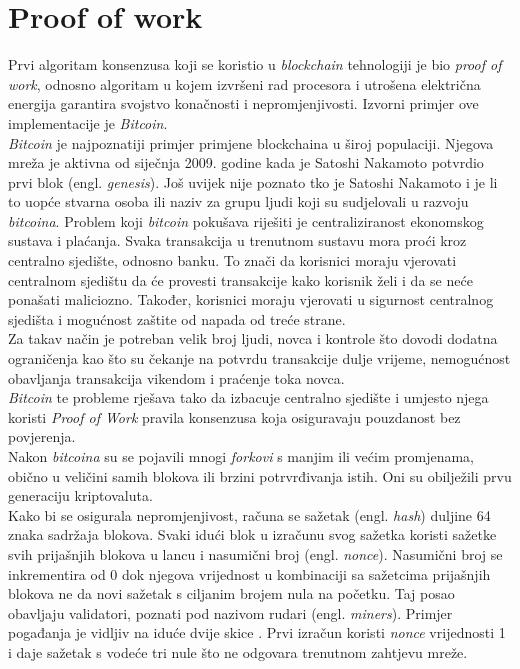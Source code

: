 \documentclass[times, utf8, zavrsni, numeric]{fer}
\begin{document}
\section{Proof of work}
Prvi algoritam konsenzusa koji se koristio u \emph{blockchain} tehnologiji je bio \emph{proof of work},
 odnosno algoritam u kojem izvršeni rad procesora i utrošena električna energija
garantira svojstvo konačnosti i nepromjenjivosti. Izvorni primjer ove implementacije je \emph{Bitcoin}. \\
\emph{Bitcoin} je najpoznatiji primjer primjene blockchaina u široj populaciji. Njegova mreža je aktivna 
od siječnja 2009. godine kada je Satoshi Nakamoto potvrdio prvi blok (engl. \emph{genesis}).
Još uvijek nije poznato tko je Satoshi Nakamoto i je li to uopće stvarna osoba ili naziv za grupu
ljudi koji su sudjelovali u razvoju \emph{bitcoina}. Problem koji \emph{bitcoin} pokušava riješiti je centraliziranost
ekonomskog sustava i plaćanja. Svaka transakcija u trenutnom sustavu mora proći kroz centralno sjedište,
odnosno banku. To znači da korisnici moraju vjerovati centralnom sjedištu da će provesti transakcije
kako korisnik želi i da se neće ponašati maliciozno. Također, korisnici moraju vjerovati u sigurnost
centralnog sjedišta i mogućnost zaštite od napada od treće strane. \\
Za takav način je potreban velik broj ljudi, novca i kontrole što dovodi dodatna ograničenja kao što 
su čekanje na potvrdu transakcije dulje vrijeme, nemogućnost obavljanja transakcija vikendom i praćenje
toka novca. \\
\emph{Bitcoin} te probleme rješava tako da izbacuje centralno sjedište i umjesto njega koristi \emph{Proof of Work}
pravila konsenzusa koja osiguravaju pouzdanost bez povjerenja. \\
Nakon \emph{bitcoina} su se pojavili mnogi \emph{forkovi} s manjim ili većim promjenama, obično u veličini
samih blokova ili brzini potrvrđivanja istih. Oni su obilježili prvu generaciju kriptovaluta. \\
Kako bi se osigurala nepromjenjivost, računa se sažetak (engl. \emph{hash}) duljine 64 znaka sadržaja blokova. 
Svaki idući blok u izračunu svog sažetka koristi sažetke svih prijašnjih blokova u lancu i nasumični broj (engl. \emph{nonce}). Nasumični broj se inkrementira od 0
dok njegova vrijednost u kombinaciji sa sažetcima prijašnjih blokova ne da novi sažetak s ciljanim brojem nula na početku. Taj posao obavljaju validatori, poznati pod nazivom
rudari (engl. \emph{miners}). Primjer pogađanja je vidljiv na iduće dvije skice \citep{PoWAsync}. Prvi izračun koristi \emph{nonce} vrijednosti 1 i daje sažetak s vodeće
tri nule što ne odgovara trenutnom zahtjevu mreže.
\end{document}
